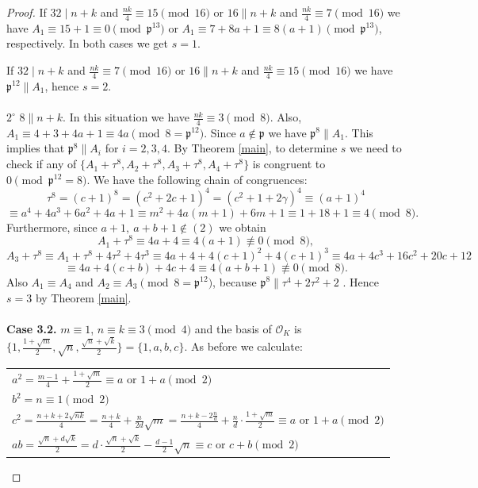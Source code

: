 \documentclass[12pt]{article}
\theoremstyle{remark}
\newcommand{\p}{\mathfrak{p}}
\begin{document}
\begin{proof}
If $32 \mid n+k$ and $\frac{nk}{4} \equiv 15 \pmod{16}$ or $16 \parallel n+k$ and $\frac{nk}{4} \equiv 7 \pmod{16}$ we have $A_1 \equiv 15 + 1 \equiv 0 \pmod{\p^{13}}$ or $A_1 \equiv 7 + 8a + 1 \equiv 8(a+1) \pmod{\p^{13}}$, respectively. In both cases we get $s=1$. 

If $32 \mid n+k$ and $\frac{nk}{4} \equiv 7 \pmod{16}$ or $16 \parallel n+k$ and $\frac{nk}{4} \equiv 15 \pmod{16}$ we have $\mathfrak{p}^{12} \parallel A_1$, hence $s=2$.
\\ \\
$2^{\circ}$ $8 \parallel n+k$. In this situation we have $\frac{nk}{4} \equiv 3 \pmod{8}$. Also, $A_1 \equiv 4 + 3 + 4a + 1 \equiv 4a \pmod{8 = \mathfrak{p}^{12}}$. Since $a \not\in \mathfrak{p}$ we have $\mathfrak{p}^8 \parallel A_1$. This implies that $\mathfrak{p}^8 \parallel A_i$ for $i=2,3,4$. By Theorem \ref{main}, to determine $s$ we need to check if any of $\{A_1+\tau^8, A_2+\tau^8, A_3+\tau^8, A_4+\tau^8\}$ is congruent to $0 \pmod{\mathfrak{p}^{12} = 8}$. We have the following chain of congruences:
\[ \tau^8 = (c+1)^8 = (c^2+2c+1)^4 = (c^2+1  + 2\gamma)^4  \equiv (a+1)^4 \]
\[  \equiv a^4 + 4a^3+6a^2+4a+1 \equiv m^2 + 4a(m+1) + 6m + 1 \equiv 1 + 18 + 1 \equiv 4 \pmod{8}. \]
Furthermore, since $a+1, \  a+b+1 \not\in (2)$ we obtain
\[ A_1 + \tau^8 \equiv 4a + 4 \equiv 4(a+1) \not\equiv 0 \pmod{8 },\]
\[A_3 + \tau^8 \equiv A_1 + \tau^8 + 4\tau^2+4\tau^3 \equiv 4a + 4 + 4(c+1)^2 + 4(c+1)^3 \equiv 4a + 4c^3 + 16c^2 + 20c + 12\]  \[\equiv 4a + 4(c+b) + 4c + 4 \equiv 4(a+b+1) \not\equiv 0 \pmod{8 }.\]
Also $A_1 \equiv A_4$ and $A_2 \equiv A_3 \pmod{8 = \mathfrak{p}^{12} }$, because $\mathfrak{p}^8 \parallel \tau^4+2\tau^2+2$ . Hence $s=3$ by Theorem \ref{main}.
\\ \\
\textbf{Case 3.2.} $m \equiv 1$, $n \equiv k \equiv 3 \pmod{4}$ and the basis of $\mathcal{O}_K$ is $\{1, \frac{1+\sqrt{m}}{2}, \sqrt{n}, \frac{\sqrt{n}+\sqrt{k}}{2}\} = \{1,a,b,c\}$. As before we calculate:
\begin{center}
\begin{tabular}{@{}l@{}}
$a^2 = \frac{m-1}{4} + \frac{1+\sqrt{m}}{2} \equiv a \text{ or } 1 + a \pmod{2}$ \\
$b^2 = n \equiv 1 \pmod{2}$\\
$c^2 = \frac{n+k+2\sqrt{nk}}{4} = \frac{n+k}{4} + \frac{n}{2d}\sqrt{m} = \frac{n+k-2\frac{n}{d}}{4} + \frac{n}{d} \cdot \frac{1+\sqrt{m}}{2} \equiv a \text{ or } 1+a \pmod{2}$\\
$ab = \frac{\sqrt{n} + d\sqrt{k}}{2} = d \cdot \frac{\sqrt{n}+\sqrt{k}}{2} - \frac{d-1}{2} \sqrt{n} \equiv c \text{ or } c + b \pmod{2} $\\

\end{tabular}
\end{center}
\end{proof}
\end{document}
